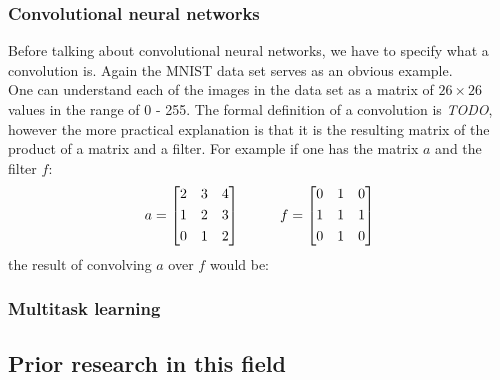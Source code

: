
\subsubsection{Convolutional neural networks}
Before talking about convolutional neural networks, we have to specify what a convolution is. Again the MNIST data set serves as an obvious example.\\
One can understand each of the images in the data set as a matrix of $26\times26$ values in the range of 0 - 255. The formal definition of a convolution is \emph{TODO}, however the more practical explanation is that it is the resulting matrix of the product of a matrix and a filter. For example if one has the matrix $a$ and the filter $f$:
\[
a = \begin{bmatrix}
       2 & 3 & 4           \\[0.3em]
       1 & 2 & 3 \\[0.3em]
       0 & 1 & 2
     \end{bmatrix}
\hspace*{1cm}
f = \begin{bmatrix}
       0 & 1 & 0           \\[0.3em]
       1 & 1 & 1 \\[0.3em]
       0 & 1 & 0
     \end{bmatrix}     
\]
the result of convolving $a$ over $f$ would be:
\subsubsection{Multitask learning}

\subsection{Prior research in this field}

